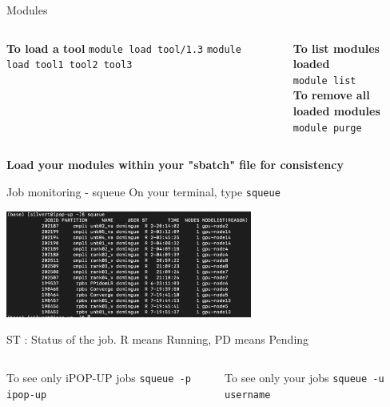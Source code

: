 \documentclass{beamer}
\begin{document}
\begin{frame}[fragile]{Modules}
    \begin{columns}
    \begin{column}{0.4\textwidth}
    \textbf{To load a tool}
    \verb|module load tool/1.3|
    \verb|module load tool1 tool2 tool3|
   
    \end{column}
    \begin{column}{0.1\textwidth}
    \\
    \end{column}
    \begin{column}{0.4\textwidth}
    \textbf{To list modules loaded}\\
    \verb|module list|
    \\
    \parskip=8pt
    \textbf{To remove all loaded modules}\\
    \verb|module purge|
    \end{column}
    \end{columns}
    \parskip=20pt
    \begin{center}
        \textbf{Load your modules within your "sbatch" file for consistency}
    \end{center}
\end{frame}



\begin{frame}[fragile]{Job monitoring - squeue}
On your terminal, type \verb|squeue|
\begin{center}
    \includegraphics[height = 3.5cm]{Images/squeue.png}
\end{center}

ST : Status of the job. R means Running, PD means Pending\\
\begin{columns}
\begin{column}{5cm}
To see only iPOP-UP jobs
\verb|squeue -p ipop-up|
\end{column}

\begin{column}{5cm}
To see only your jobs
\verb|squeue -u username|
\end{column}
\end{columns}
\end{frame}
    
\end{document}
